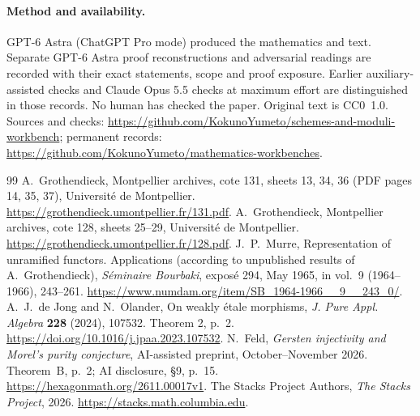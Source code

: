 \documentclass[11pt]{article}
\theoremstyle{definition}\newtheorem{definition}[theorem]{Definition}
\theoremstyle{remark}\newtheorem{remark}[theorem]{Remark}
\newcommand{\workbenchurl}{https://github.com/KokunoYumeto/schemes-and-moduli-workbench}
\newcommand{\recordurl}{https://github.com/KokunoYumeto/mathematics-workbenches}
\begin{document}
\paragraph{Method and availability.}

GPT-6 Astra (ChatGPT Pro mode) produced the mathematics and text. Separate GPT-6 Astra proof reconstructions and adversarial readings are recorded with their exact statements, scope and proof exposure. Earlier auxiliary-assisted checks and Claude Opus 5.5 checks at maximum effort are distinguished in those records. No human has checked the paper. Original text is CC0~1.0. Sources and checks: \url{\workbenchurl}; permanent records: \url{\recordurl}.

\enlargethispage{1.5\baselineskip}
\begin{thebibliography}{99}
\footnotesize\setlength{\itemsep}{0pt}
 A.~Grothendieck, Montpellier archives, cote 131, sheets 13, 34, 36 (PDF pages 14, 35, 37), Universit\'e de Montpellier. \url{https://grothendieck.umontpellier.fr/131.pdf}.
 A.~Grothendieck, Montpellier archives, cote 128, sheets 25--29, Universit\'e de Montpellier. \url{https://grothendieck.umontpellier.fr/128.pdf}.
 J.~P.~Murre, Representation of unramified functors. Applications (according to unpublished results of A.~Grothendieck), \emph{S\'eminaire Bourbaki}, expos\'e 294, May 1965, in vol.~9 (1964--1966), 243--261. \url{https://www.numdam.org/item/SB_1964-1966__9__243_0/}.
 A.~J.~de Jong and N.~Olander, On weakly \'etale morphisms, \emph{J. Pure Appl. Algebra} \textbf{228} (2024), 107532. Theorem 2, p.~2. \url{https://doi.org/10.1016/j.jpaa.2023.107532}.
 N.~Feld, \emph{Gersten injectivity and Morel's purity conjecture}, AI-assisted preprint, October--November 2026. Theorem~B, p.~2; AI disclosure, \S9, p.~15. \url{https://hexagonmath.org/2611.00017v1}.
 The Stacks Project Authors, \emph{The Stacks Project}, 2026. \url{https://stacks.math.columbia.edu}.
\end{thebibliography}
\end{document}

